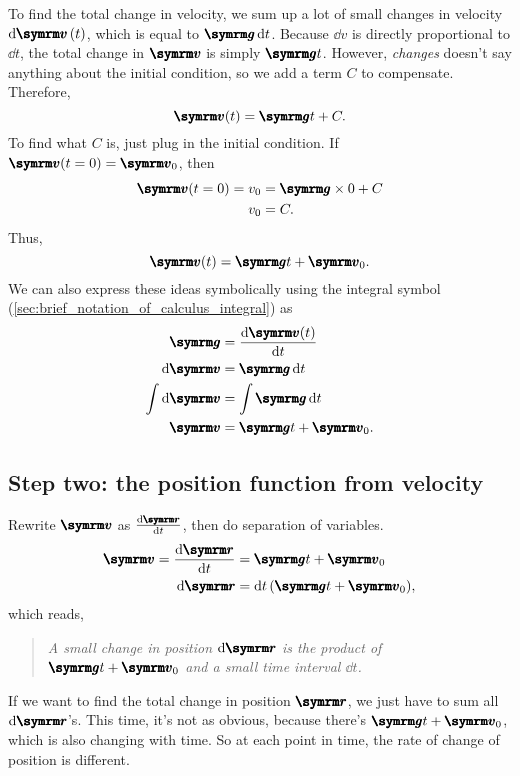 \begin{multicols}{2}
To find the total change in velocity, we sum up a lot of small changes in velocity $\dd{\vv{v}}(t)$, which is equal to $\vv{g}\dd{t}$. Because $\dd{v}$ is directly proportional to $\dd{t}$, the total change in $\vv{v}$ is simply $\vv{g}t$. However, \emph{changes} doesn't say anything about the initial condition, so we add a term $C$ to compensate. Therefore,
\begin{equation}
    \vv{v}(t) = \vv{g}t + C.
\end{equation}
To find what $C$ is, just plug in the initial condition. If $\vv{v}(t = 0) = \vv{v}_0$, then
\begin{align}
    \vv{v}(t = 0) = v_0 &= \vv{g}\times 0 + C \\
    v_0 &= C.
\end{align}
Thus,
\begin{equation}
    \vv{v}(t) = \vv{g}t + \vv{v}_0.
\end{equation}
We can also express these ideas symbolically using the integral symbol (\cref{sec:brief_notation_of_calculus_integral}) as
\begin{align}
    \vv{g} &= \dv{\vv{v}(t)}{t} \\
    \dd{\vv{v}} &= \vv{g}\dd{t} \\
    \int\dd{\vv{v}} &= \int \vv{g}\dd{t} \\
    \vv{v} &= \vv{g}t + \vv{v}_0. \label{eq:simplemotionr}
\end{align}
\end{multicols}

\subsection{Step two: the position function from velocity}
Rewrite $\vv{v}$ as $\dv{\vv{r}}{t}$, then do separation of variables.
\begin{align}
    \vv{v} = \dv{\vv{r}}{t} &= \vv{g}t + \vv{v}_0 \label{eq:simplemotionr2} \\
    \dd{\vv{r}} &= \dd{t}(\vv{g}t + \vv{v}_0),\label{eq:simplemotionr3}
\end{align}
which reads,
\begin{quotation}
    \emph{A small change in position $\dd{\vv{r}}$ is the product of $\vv{g}t + \vv{v}_0$ and a small time interval $\dd{t}$.}
    \label{quote}
\end{quotation}
If we want to find the total change in position $\vv{r}$, we just have to sum all $\dd{\vv{r}}$'s. This time, it's not as obvious, because there's $\vv{g}t + \vv{v}_0$, which is also changing with time. So at each point in time, the rate of change of position is different.

